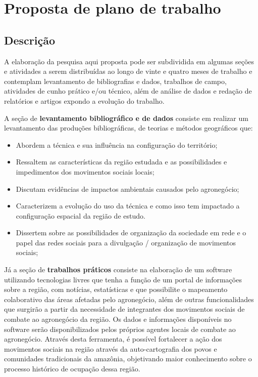 \chapter{Proposta de plano de trabalho}

\section{Descrição}

A elaboração da pesquisa aqui proposta pode ser subdividida em algumas seções e atividades a serem distribuídas ao longo de vinte e quatro meses de trabalho e contemplam levantamento de bibliografias e dados, trabalhos de campo, atividades de cunho prático e/ou técnico, além de análise de dados e redação de relatórios e artigos expondo a evolução do trabalho.

A seção de \textbf{levantamento bibliográfico e de dados} consiste em realizar um levantamento das produções bibliográficas, de teorias e métodos geográficos que:

\begin{itemize}
 \item Abordem a técnica e sua influência na configuração do território;
 \item Ressaltem as características da região estudada e as possibilidades e impedimentos dos movimentos sociais locais;
 \item Discutam evidências de impactos ambientais causados pelo agronegócio;
 \item Caracterizem a evolução do uso da técnica e como isso tem impactado a configuração espacial da região de estudo.
 \item Dissertem sobre as possibilidades de organização da sociedade em rede e o papel das redes sociais para a divulgação / organização de movimentos sociais;
\end{itemize}

Já a seção de \textbf{trabalhos práticos} consiste na elaboração de um software utilizando tecnologias livres que tenha a função de um portal de informações sobre a região, com notícias, estatísticas e que possibilite o mapeamento colaborativo das áreas afetadas pelo agronegócio, além de outras funcionalidades que surgirão a partir da necessidade de integrantes dos movimentos sociais de combate ao agronegócio da região. Os dados e informações disponíveis no software serão disponibilizados pelos próprios agentes locais de combate ao agronegócio. Através desta ferramenta, é possível fortalecer a ação dos movimentos sociais na região através da auto-cartografia dos povos e comunidades tradicionais da amazônia, objetivando maior conhecimento sobre o processo histórico de ocupação dessa região.

